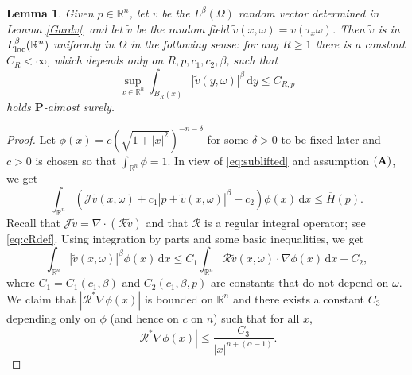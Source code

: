 \documentclass[11pt,reqno]{amsart}
\newtheorem{lem}[thm]{Lemma}
\theoremstyle{definition}
\theoremstyle{remark}
\numberwithin{equation}{section}
\newcommand{\R}{{\mathbb{R}}}
\begin{document}
\begin{lem}\label{Ecv} Given $p\in \R^n$, let $v$ be the $L^\beta(\Omega)$ random vector determined in Lemma \ref{Gardv}, and let $\widetilde{v}$ be the random field $\widetilde{v}(x,\omega)=v(\tau_x \omega)$. Then $\widetilde{v}$ is in $L^\beta_{\rm loc}(\R^n)$ uniformly in $\Omega$ in the following sense: for any $R\ge 1$ there is a constant $C_{R} < \infty$, which depends only on $R,p,c_1,c_2,\beta$, such that 
\begin{equation}
\label{eq:unifbddv}
     \sup_{x\in\mathbb{R}^n}\int_{B_R(x)} |\widetilde v(y,\omega)|^{\beta} \,\mathrm{d}y  \le C_{R,p}
\end{equation}
holds $\mathbf{P}$-almost surely.
\end{lem}
\begin{proof} Let $\phi(x) = c(\sqrt{1+|x|^2})^{-n-\delta}$ for some $\delta>0$ to be fixed later and $c>0$ is chosen so that $\int_{\R^n} \phi =1$. In view of \eqref{eq:sublifted} and assumption $(\bf{A})$, we get
\begin{equation}
    \int_{\mathbb{R}^n}(\mathscr{J}\widetilde v (x,\omega) + c_{1}|p + \widetilde v(x,\omega)|^{\beta} - c_{2})\phi(x)\,\mathrm{d}x \leq \overline{H}(p).
\end{equation}
Recall that $\mathscr{J}\widetilde v=\nabla \cdot (\mathcal{R}\widetilde v)$ and that $\mathcal{R}$ is a regular integral operator; see \eqref{eq:cRdef}. Using integration by parts and some basic inequalities, we get
\begin{equation}\label{vLpE}
    \int_{\mathbb{R}^n} |\widetilde v(x,\omega)|^{\beta}\phi(x)\,\mathrm{d}x  
    \leq C_{1} \int_{\mathbb{R}^n}  \mathcal{R} \widetilde v (x,\omega)\cdot \nabla \phi(x)\,\mathrm{d}x + C_{2},
\end{equation}
where $C_1 = C_1(c_1,\beta)$ and $C_2(c_1,\beta,p)$ are constants that do not depend on $\omega$. We claim that $|\mathcal{R}^*\nabla \phi(x)|$ is bounded on $\R^n$ and there exists a constant $C_3$ depending only on $\phi$ (and hence on $c$ on $n$) such that for all $x$, 
\begin{equation}
\label{eq:bddR*phi}
    \left|\mathcal{R}^* \nabla \phi(x)\right| \le \frac{C_3}{|x|^{n+(\alpha-1)}}.%
\end{equation}


\end{proof}
\end{document}
